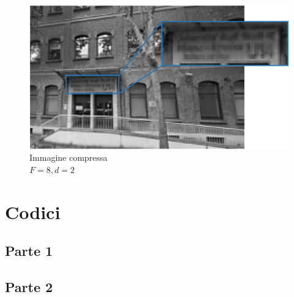 \documentclass[preprint,12pt]{elsarticle}
\begin{document}
\begin{figure}[H]
	\includegraphics[width=\linewidth]{f4}
	\caption{Immagine compressa\\$F = 8, d = 2$}
	\centering
\end{figure}

\newpage

\section{Codici}

\subsection{Parte 1}

%

\newpage 
\subsection{Parte 2}

%
\end{document}
